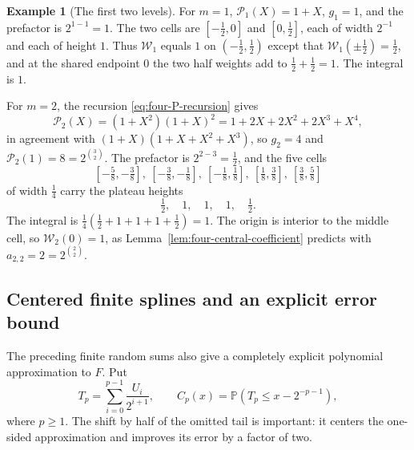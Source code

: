 \documentclass[11pt,oneside]{article}
\theoremstyle{definition}
\newtheorem{example}[theorem]{Example}
\theoremstyle{remark}
\newcommand{\Prob}{\mathbb P}
\begin{document}
\begin{example}[The first two levels]
\label{ex:four-first-levels}
For $m=1$, $\mathcal P_1(X)=1+X$, $g_1=1$, and the prefactor is
$2^{1-1}=1$.  The two cells are $[-\tfrac12,0]$ and $[0,\tfrac12]$, each of width $2^{-1}$
and each of height $1$.  Thus $\mathcal W_1$ equals $1$ on $(-\tfrac12,\tfrac12)$ except that
$\mathcal W_1(\pm\tfrac12)=\tfrac12$, and at the shared endpoint $0$ the two half weights
add to $\tfrac12+\tfrac12=1$.  The integral is $1$.

For $m=2$, the recursion \eqref{eq:four-P-recursion} gives
\begin{equation*}
 \mathcal P_2(X)=(1+X^2)(1+X)^2=1+2X+2X^2+2X^3+X^4,
\end{equation*}
in agreement with $(1+X)(1+X+X^2+X^3)$, so $g_2=4$ and $\mathcal P_2(1)=8=2^{\binom32}$.  The
prefactor is $2^{2-3}=\tfrac12$, and the five cells
\begin{equation*}
 \left[-\tfrac58,-\tfrac38\right],\
 \left[-\tfrac38,-\tfrac18\right],\
 \left[-\tfrac18,\tfrac18\right],\
 \left[\tfrac18,\tfrac38\right],\
 \left[\tfrac38,\tfrac58\right]
\end{equation*}
of width $\tfrac14$ carry the plateau heights
\begin{equation*}
 \tfrac12,\quad 1,\quad 1,\quad 1,\quad \tfrac12 .
\end{equation*}
The integral is $\tfrac14\left(\tfrac12+1+1+1+\tfrac12\right)=1$.  The origin is interior to
the middle cell, so $\mathcal W_2(0)=1$, as Lemma~\ref{lem:four-central-coefficient}
predicts with $a_{2,2}=2=2^{\binom22}$.
\end{example}

\subsection{Centered finite splines and an explicit error bound}
\label{sec:centered-splines}

The preceding finite random sums also give a completely explicit polynomial approximation
to $F$.  Put
\begin{equation}
 T_p=\sum_{i=0}^{p-1}\frac{U_i}{2^{i+1}},
 \qquad
 C_p(x)=\Prob\left(T_p\le x-2^{-p-1}\right),               \label{eq:centered-partial-cdf}
\end{equation}
where $p\ge1$.  The shift by half of the omitted tail is important: it centers the
one-sided approximation and improves its error by a factor of two.
\end{document}
